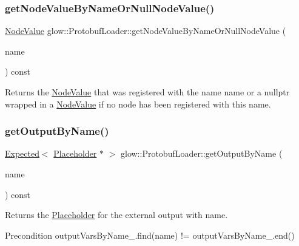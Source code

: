 \subsubsection{\texorpdfstring{get\+Node\+Value\+By\+Name\+Or\+Null\+Node\+Value()}{getNodeValueByNameOrNullNodeValue()}}
{\footnotesize\ttfamily \hyperlink{structglow_1_1_node_value}{Node\+Value} glow\+::\+Protobuf\+Loader\+::get\+Node\+Value\+By\+Name\+Or\+Null\+Node\+Value (\begin{DoxyParamCaption}\item[{llvm\+::\+String\+Ref}]{name }\end{DoxyParamCaption}) const\hspace{0.3cm}{\ttfamily [protected]}}

\begin{DoxyReturn}{Returns}
the \hyperlink{structglow_1_1_node_value}{Node\+Value} that was registered with the name {\ttfamily name} or a nullptr wrapped in a \hyperlink{structglow_1_1_node_value}{Node\+Value} if no node has been registered with this name. 
\end{DoxyReturn}
\mbox{\label{classglow_1_1_protobuf_loader_aa74cf67a8dae7eb8c6793aae25589c24}} 
\subsubsection{\texorpdfstring{get\+Output\+By\+Name()}{getOutputByName()}}
{\footnotesize\ttfamily \hyperlink{classglow_1_1detail_1_1_glow_expected}{Expected}$<$ \hyperlink{classglow_1_1_placeholder}{Placeholder} $\ast$ $>$ glow\+::\+Protobuf\+Loader\+::get\+Output\+By\+Name (\begin{DoxyParamCaption}\item[{llvm\+::\+String\+Ref}]{name }\end{DoxyParamCaption}) const}

\begin{DoxyReturn}{Returns}
the \hyperlink{classglow_1_1_placeholder}{Placeholder} for the external output with {\ttfamily name}. 
\end{DoxyReturn}
\begin{DoxyPrecond}{Precondition}
output\+Vars\+By\+Name\+\_\+.\+find(name) != output\+Vars\+By\+Name\+\_\+.\+end() 
\end{DoxyPrecond}
\mbox{\label{classglow_1_1_protobuf_loader_a7e89514a172bff5eb02915725d26e315}} 
